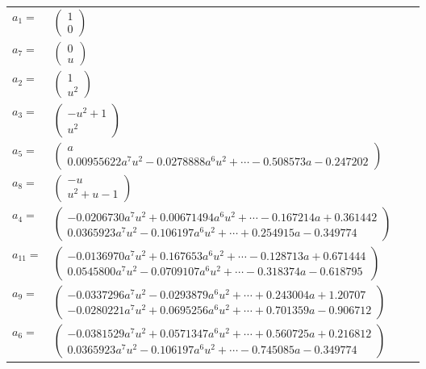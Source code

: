\documentclass[1p]{elsarticle_modified}
\theoremstyle{definition}
\begin{document}
\begin{tabular}{m{7pt} m{180pt} m{7pt} m{180pt} }
\flushright $a_{1}=$&$\begin{pmatrix}1\\0\end{pmatrix}$ \\
\flushright $a_{7}=$&$\begin{pmatrix}0\\u\end{pmatrix}$ \\
\flushright $a_{2}=$&$\begin{pmatrix}1\\u^2\end{pmatrix}$ \\
\flushright $a_{3}=$&$\begin{pmatrix}- u^2+1\\u^2\end{pmatrix}$ \\
\flushright $a_{5}=$&$\begin{pmatrix}a\\0.00955622 a^{7} u^{2}-0.0278888 a^{6} u^{2}+\cdots-0.508573 a-0.247202\end{pmatrix}$ \\
\flushright $a_{8}=$&$\begin{pmatrix}- u\\u^2+u-1\end{pmatrix}$ \\
\flushright $a_{4}=$&$\begin{pmatrix}-0.0206730 a^{7} u^{2}+0.00671494 a^{6} u^{2}+\cdots-0.167214 a+0.361442\\0.0365923 a^{7} u^{2}-0.106197 a^{6} u^{2}+\cdots+0.254915 a-0.349774\end{pmatrix}$ \\
\flushright $a_{11}=$&$\begin{pmatrix}-0.0136970 a^{7} u^{2}+0.167653 a^{6} u^{2}+\cdots-0.128713 a+0.671444\\0.0545800 a^{7} u^{2}-0.0709107 a^{6} u^{2}+\cdots-0.318374 a-0.618795\end{pmatrix}$ \\
\flushright $a_{9}=$&$\begin{pmatrix}-0.0337296 a^{7} u^{2}-0.0293879 a^{6} u^{2}+\cdots+0.243004 a+1.20707\\-0.0280221 a^{7} u^{2}+0.0695256 a^{6} u^{2}+\cdots+0.701359 a-0.906712\end{pmatrix}$ \\
\flushright $a_{6}=$&$\begin{pmatrix}-0.0381529 a^{7} u^{2}+0.0571347 a^{6} u^{2}+\cdots+0.560725 a+0.216812\\0.0365923 a^{7} u^{2}-0.106197 a^{6} u^{2}+\cdots-0.745085 a-0.349774\end{pmatrix}$ \\

\end{tabular}
\end{document}
